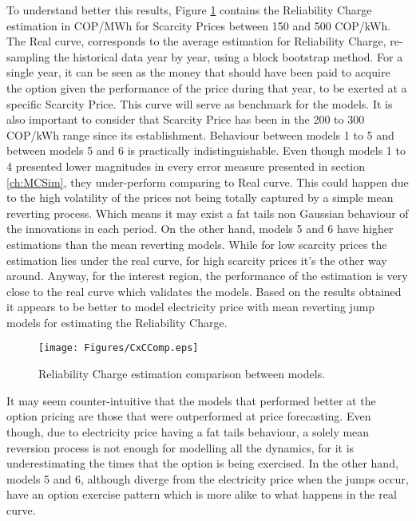 \documentclass[3p]{elsarticle}
\begin{document}
To understand better this results, Figure \ref{fig:CxC} contains the Reliability Charge estimation in COP/MWh for Scarcity Prices between 150 and 500 COP/kWh. The Real curve, corresponds to the average estimation for Reliability Charge, re-sampling the historical data year by year, using a block bootstrap method. For a single year, it can be seen as the money that should have been paid to acquire the option given the performance of the price during that year, to be exerted at a specific Scarcity Price. This curve will serve as benchmark for the models. It is also important to consider that Scarcity Price has been in the 200 to 300 COP/kWh range since its establishment. Behaviour between models 1 to 5 and between models 5 and 6 is practically indistinguishable. Even though models 1 to 4 presented lower magnitudes in every error measure presented in section \ref{ch:MCSim}, they under-perform comparing to Real curve. This could happen due to the high volatility of the prices not being totally captured by a simple mean reverting process. Which means it may exist a fat tails non Gaussian behaviour of the innovations in each period. On the other hand, models 5 and 6 have higher estimations than the mean reverting models. While for low scarcity prices the estimation lies under the real curve, for high scarcity prices 
it's the other way around. Anyway, for the interest region, the performance of the estimation is very close to the real curve which validates the models. Based on the results obtained it appears to be better to model electricity price with mean reverting jump models for estimating the Reliability Charge.

\begin{figure}[!h] 
\center
\texttt{[image: Figures/CxCComp.eps]}
\caption{Reliability Charge estimation comparison between models.}
\label{fig:CxC}
\end{figure}

It may seem counter-intuitive that the models that performed better at the option pricing are those that were outperformed at price forecasting. Even though, due to electricity price having a fat tails behaviour, a solely mean reversion process is not enough for modelling all the dynamics, for it is underestimating the times that the option is being exercised. In the other hand, models 5 and 6, although diverge from the electricity price when the jumps occur, have an option exercise pattern which is more alike to what happens in the real curve.
\end{document}

